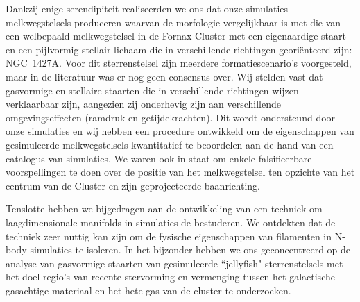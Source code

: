 Dankzij enige serendipiteit realiseerden we ons dat onze simulaties melkwegstelsels produceren waarvan de morfologie vergelijkbaar is met die van een welbepaald melkwegstelsel in de Fornax Cluster met een eigenaardige  \Hi{} staart en een pijlvormig stellair lichaam die in verschillende richtingen georiënteerd zijn: NGC~1427A.
Voor dit sterrenstelsel zijn meerdere formatiescenario's voorgesteld, maar in de literatuur was er nog geen consensus over.
Wij stelden vast dat gasvormige en stellaire staarten die in verschillende richtingen wijzen verklaarbaar zijn, aangezien zij onderhevig zijn aan verschillende omgevingseffecten (ramdruk en getijdekrachten).
Dit wordt ondersteund door onze simulaties en wij hebben een procedure ontwikkeld om de eigenschappen van gesimuleerde melkwegstelsels kwantitatief te beoordelen aan de hand van een catalogus van simulaties.
We waren ook in staat om enkele falsifieerbare voorspellingen te doen over de positie van het melkwegstelsel ten opzichte van het centrum van de Cluster en zijn geprojecteerde baanrichting.

Tenslotte hebben we bijgedragen aan de ontwikkeling van een techniek om laagdimensionale manifolds in simulaties de bestuderen.
We ontdekten dat de techniek zeer nuttig kan zijn om de fysische eigenschappen van filamenten in N-body-simulaties te isoleren.
In het bijzonder hebben we ons geconcentreerd op de analyse van gasvormige staarten van gesimuleerde ``jellyfish"-sterrenstelsels met het doel regio's van recente stervorming en vermenging tussen het galactische gasachtige materiaal en het hete gas van de cluster te onderzoeken.

